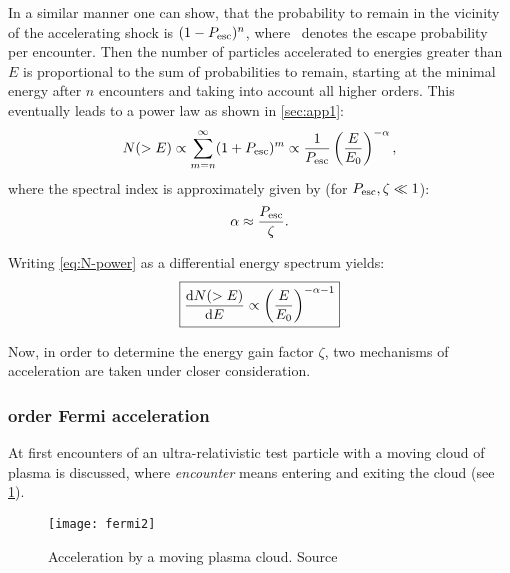 In a similar manner one can show, that the probability to remain in the
vicinity of the accelerating shock is $(1-P_{\mathrm{esc}})^n$, where \Pesc~denotes the
escape probability per encounter.
Then the number of particles accelerated to energies greater than $E$ is
proportional to the sum of probabilities to remain, starting at the minimal
energy after $n$ encounters and taking into account all higher orders. This
eventually leads to a power law as shown in \cref{sec:app1}:
\begin{equation}
    N(>E)\propto\sum_{m=n}^{\infty}(1+P_{\mathrm{esc}})^m
    \propto\frac{1}{P_{\mathrm{esc}}}\left(\frac{E}{E_0}\right)^{-\alpha},
    \label{eq:N-power}
\end{equation}
where the spectral index is approximately given by (for $P_{\mathrm{esc}},\zeta\ll1$):
\begin{equation}
    \alpha\approx\frac{P_{\mathrm{esc}}}{\zeta}.
    \label{eq:alpha}
\end{equation}

Writing \cref{eq:N-power} as a differential energy spectrum yields:
\begin{equation}
    \boxed{%
        \dv{N(>E)}{E}\propto\left(\frac{E}{E_0}\right)^{-\alpha-1}
    }
    \label{eq:N-diff}
\end{equation}

Now, in order to determine the energy gain factor $\zeta$, two mechanisms of
acceleration are taken under closer consideration.


\subsubsection{ order Fermi acceleration}
At first encounters of an ultra-relativistic test particle with
a moving cloud of plasma is discussed, where \emph{encounter} means entering
and exiting the cloud (see \cref{fig:fermi2}).

\begin{figure}[ht]
    \centering
    \texttt{[image: fermi2]}
    \caption{Acceleration by a moving plasma cloud. Source\autocite{Gaisser}}
    \label{fig:fermi2}
\end{figure}

